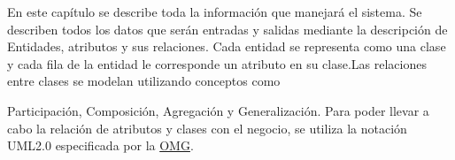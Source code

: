 En este capítulo se describe toda la información que manejará el sistema. Se describen todos los datos que serán entradas y salidas mediante la descripción de Entidades, atributos y sus relaciones. Cada entidad se representa como una clase y cada fila de la entidad le corresponde un atributo en su clase.Las relaciones entre clases se modelan utilizando conceptos como

Participación, Composición, Agregación y Generalización. Para poder llevar a cabo la relación de atributos y clases con el negocio, se utiliza la notación UML2.0 especificada por la \href{www.omg.org}{OMG}.








